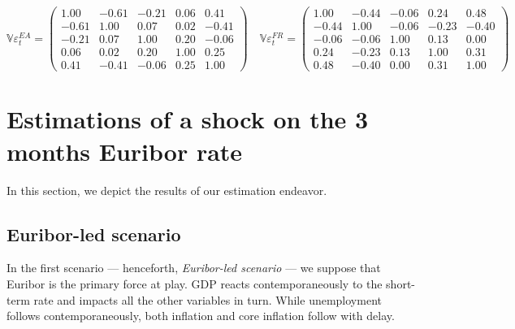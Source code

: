 \documentclass[
  11pt,
]{article}
\begin{document}
\begin{equation}
\mathbb{V}\varepsilon^{EA}_t = 
\begin{pmatrix}
 1.00 & -0.61 & -0.21 & 0.06 & 0.41 \\
-0.61 & 1.00 & 0.07 & 0.02 & -0.41 \\
-0.21 & 0.07 & 1.00 & 0.20 & -0.06 \\
0.06 & 0.02 & 0.20 & 1.00 & 0.25 \\
0.41 & -0.41 & -0.06 & 0.25 & 1.00 
\end{pmatrix}
\quad
\mathbb{V}\varepsilon^{FR}_t = 
\begin{pmatrix}
 1.00 & -0.44 & -0.06 & 0.24 & 0.48 \\
-0.44 & 1.00 & -0.06 & -0.23 & -0.40 \\
-0.06 & -0.06 & 1.00 & 0.13 & 0.00 \\
0.24 & -0.23 & 0.13 & 1.00 & 0.31 \\
0.48 & -0.40 & 0.00 & 0.31 & 1.00 
\end{pmatrix}
\label{eq:variances}
\end{equation}

\hypertarget{sec:est}{%
\section{Estimations of a shock on the 3 months Euribor rate}\label{sec:est}}

In this section, we depict the results of our estimation endeavor.

\hypertarget{euribor-led-scenario}{%
\subsection{Euribor-led scenario}\label{euribor-led-scenario}}

In the first scenario --- henceforth, \emph{Euribor-led scenario} --- we suppose that Euribor is the primary force at play.
GDP reacts contemporaneously to the short-term rate and impacts all the other variables in turn. While unemployment follows contemporaneously, both inflation and core inflation follow with delay.
\end{document}
